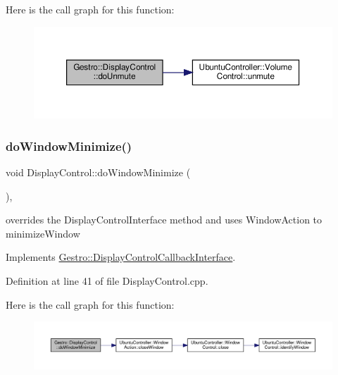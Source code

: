 Here is the call graph for this function\+:
\nopagebreak
\begin{figure}[H]
\begin{center}
\leavevmode
\includegraphics[width=350pt]{class_gestro_1_1_display_control_a210411b559d8c3ffb1498f49cfa26a6d_cgraph}
\end{center}
\end{figure}
\mbox{\label{class_gestro_1_1_display_control_ad5fa763a77c680ce7b2089c6d79c4eb7}} 
\subsubsection{\texorpdfstring{do\+Window\+Minimize()}{doWindowMinimize()}}
{\footnotesize\ttfamily void Display\+Control\+::do\+Window\+Minimize (\begin{DoxyParamCaption}{ }\end{DoxyParamCaption})\hspace{0.3cm}{\ttfamily [override]}, {\ttfamily [virtual]}}

overrides the Display\+Control\+Interface method and uses Window\+Action to minimize\+Window 

Implements \hyperlink{class_gestro_1_1_display_control_callback_interface_a677aa306f08c548396a048c680bf5e10}{Gestro\+::\+Display\+Control\+Callback\+Interface}.



Definition at line 41 of file Display\+Control.\+cpp.

Here is the call graph for this function\+:
\nopagebreak
\begin{figure}[H]
\begin{center}
\leavevmode
\includegraphics[width=350pt]{class_gestro_1_1_display_control_ad5fa763a77c680ce7b2089c6d79c4eb7_cgraph}
\end{center}
\end{figure}
\mbox{\label{class_gestro_1_1_display_control_aca4208c53cac28e164e7949effdc04cd}} 
